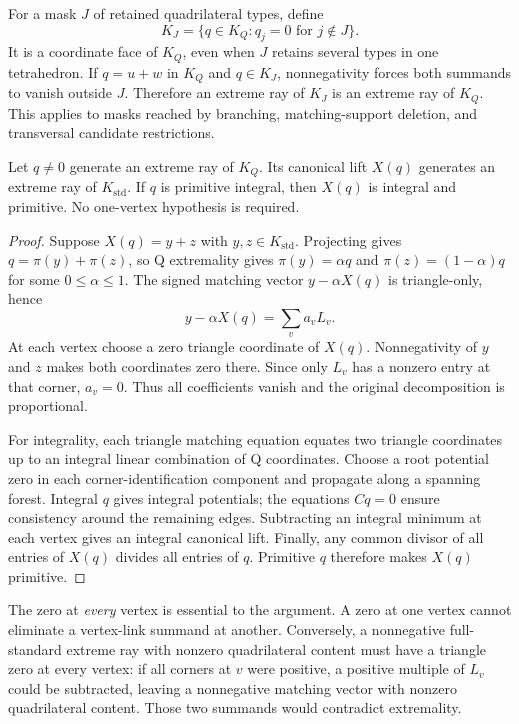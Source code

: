 For a mask $J$ of retained quadrilateral types, define
\[
 K_J=\{q\in K_Q:q_j=0\text{ for }j\notin J\}.
\]
It is a coordinate face of $K_Q$, even when $J$ retains several types in
one tetrahedron.  If $q=u+w$ in $K_Q$ and $q\in K_J$, nonnegativity forces
both summands to vanish outside $J$.  Therefore an extreme ray of $K_J$
is an extreme ray of $K_Q$.  This applies to masks reached by branching,
matching-support deletion, and transversal candidate restrictions.

\begin{proposition}
Let $q\ne0$ generate an extreme ray of $K_Q$.  Its canonical lift $X(q)$
generates an extreme ray of $K_{\mathrm{std}}$.  If $q$ is primitive
integral, then $X(q)$ is integral and primitive.  No one-vertex hypothesis
is required.
\end{proposition}
\begin{proof}
Suppose $X(q)=y+z$ with $y,z\in K_{\mathrm{std}}$.  Projecting gives
$q=\pi(y)+\pi(z)$, so Q extremality gives $\pi(y)=\alpha q$ and
$\pi(z)=(1-\alpha)q$ for some $0\le\alpha\le1$.  The signed matching
vector $y-\alpha X(q)$ is triangle-only, hence
\[
 y-\alpha X(q)=\sum_v a_v L_v.
\]
At each vertex choose a zero triangle coordinate of $X(q)$.  Nonnegativity
of $y$ and $z$ makes both coordinates zero there.  Since only $L_v$ has a
nonzero entry at that corner, $a_v=0$.  Thus all coefficients vanish and
the original decomposition is proportional.

For integrality, each triangle matching equation equates two triangle
coordinates up to an integral linear combination of Q coordinates.
Choose a root potential zero in each corner-identification component and
propagate along a spanning forest.  Integral $q$ gives integral potentials;
the equations $Cq=0$ ensure consistency around the remaining edges.
Subtracting an integral minimum at each vertex gives an integral canonical
lift.  Finally, any common divisor of all entries of $X(q)$ divides all
entries of $q$.  Primitive $q$ therefore makes $X(q)$ primitive.
\end{proof}

The zero at \emph{every} vertex is essential to the argument.  A zero at
one vertex cannot eliminate a vertex-link summand at another.  Conversely,
a nonnegative full-standard extreme ray with nonzero quadrilateral content
must have a triangle zero at every vertex: if all corners at $v$ were
positive, a positive multiple of $L_v$ could be subtracted, leaving a
nonnegative matching vector with nonzero quadrilateral content.  Those two
summands would contradict extremality.

